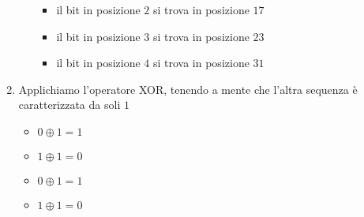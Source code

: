 \begin{framed}
\begin{enumerate}
\begin{itemize}
\begin{itemize}
				\item  il bit in posizione $2$ si trova in posizione $17$
				
				\item  il bit in posizione $3$ si trova in posizione $23$
				
				\item  il bit in posizione $4$ si trova in posizione $31$
			\end{itemize}
		\end{itemize}
		\item Applichiamo l'operatore XOR, tenendo a mente che l'altra sequenza è caratterizzata da soli $1$
		\begin{itemize}
			\item $0 \oplus 1 = 1$
			\item $1 \oplus 1 = 0$
			\item $0 \oplus 1 = 1$
			\item $1 \oplus 1 = 0$
		\end{itemize} 
	\end{enumerate} 
\end{framed} 

